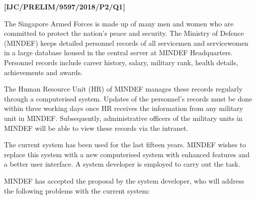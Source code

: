 \item \textbf{{[}IJC/PRELIM/9597/2018/P2/Q1{]} }

The Singapore Armed Forces is made up of many men and women who are
committed to protect the nation\textquoteright s peace and security.
The Ministry of Defence (MINDEF) keeps detailed personnel records
of all servicemen and servicewomen in a large database housed in the
central server at MINDEF Headquarters. Personnel records include career
history, salary, military rank, health details, achievements and awards.

The Human Resource Unit (HR) of MINDEF manages these records regularly
through a computerised system. Updates of the personnel\textquoteright s
records must be done within three working days once HR receives the
information from any military unit in MINDEF. Subsequently, administrative
officers of the military units in MINDEF will be able to view these
records via the intranet.

The current system has been used for the last fifteen years. MINDEF
wishes to replace this system with a new computerised system with
enhanced features and a better user interface. A system developer
is employed to carry out the task. 

MINDEF has accepted the proposal by the system developer, who will
address the following problems with the current system: 

